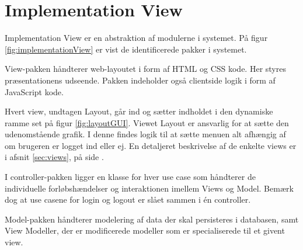 \section{Implementation View}
Implementation View er en abstraktion af modulerne i systemet. På figur \ref{fig:implementationView} er vist de identificerede pakker i systemet.


View-pakken håndterer web-layoutet i form af HTML og CSS kode. Her styres præsentationens udseende. Pakken indeholder også clientside logik i form af JavaScript kode.

Hvert view, undtagen Layout, går ind og sætter indholdet i den dynamiske ramme set på figur \ref{fig:layoutGUI}. Viewet Layout er ansvarlig for at sætte den udenomstående grafik. I denne findes logik til at sætte menuen alt afhængig af om brugeren er logget ind eller ej. En detaljeret beskrivelse af de enkelte views er i afsnit \ref{sec:views}, på side \pageref{sec:views}.


I controller-pakken ligger en klasse for hver use case som håndterer de individuelle forløbshændelser og interaktionen imellem Views og Model. Bemærk dog at use casene for login og logout er slået sammen i én controller. 

Model-pakken håndterer modelering af data der skal persisteres i databasen, samt View Modeller, der er modificerede modeller som er specialiserede til et givent view.